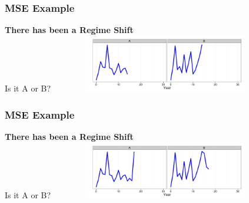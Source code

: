 \begin{frame}\frametitle{MSE Example} \smallskip\textbf{There has been a {\color{blue} Regime Shift}}\smallskip\\ Is it A or B? \includegraphics[height=25mm,width=100mm]{doug10.png}\end{frame}
\begin{frame}\frametitle{MSE Example} \smallskip\textbf{There has been a {\color{blue} Regime Shift}}\smallskip\\ Is it A or B? \includegraphics[height=25mm,width=100mm]{doug13.png}\end{frame}
